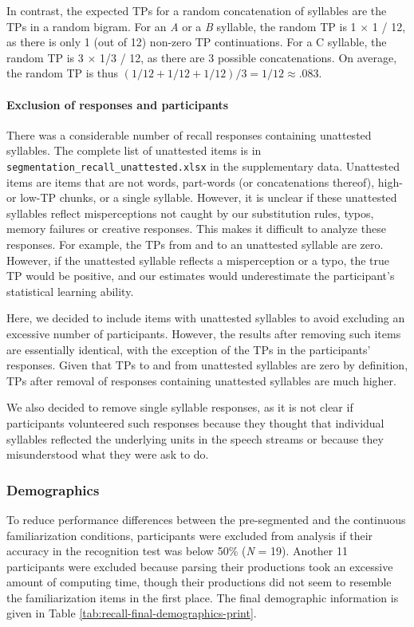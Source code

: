 \documentclass[]{article}
\let\oldparagraph\paragraph
\renewcommand{\paragraph}[1]{\oldparagraph{#1}\mbox{}}
\begin{document}
In contrast, the expected TPs for a random concatenation of syllables are the TPs in a random bigram. For an \emph{A} or a \emph{B} syllable, the random TP is 1 \(\times\) 1 / 12, as there is only 1 (out of 12) non-zero TP continuations. For a C syllable, the random TP is 3 \(\times\) 1/3 / 12, as there are 3 possible concatenations. On average, the random TP is thus \((1/12 + 1/12 + 1/12)/ 3 = 1/12 \approx .083\).

\paragraph{Exclusion of responses and participants}\label{exclusion-of-responses-and-participants}

There was a considerable number of recall responses containing unattested syllables. The complete list of unattested items is in \texttt{segmentation\_recall\_unattested.xlsx} in the supplementary data. Unattested items are items that are not words, part-words (or concatenations thereof), high- or low-TP chunks, or a single syllable. However, it is unclear if these unattested syllables reflect misperceptions not caught by our substitution rules, typos, memory failures or creative responses. This makes it difficult to analyze these responses. For example, the TPs from and to an unattested syllable are zero. However, if the unattested syllable reflects a misperception or a typo, the true TP would be positive, and our estimates would underestimate the participant's statistical learning ability.

Here, we decided to include items with unattested syllables to avoid excluding an excessive number of participants. However, the results after removing such items are essentially identical, with the exception of the TPs in the participants' responses. Given that TPs to and from unattested syllables are zero by definition, TPs after removal of responses containing unattested syllables are much higher.

We also decided to remove single syllable responses, as it is not clear if participants volunteered such responses because they thought that individual syllables reflected the underlying units in the speech streams or because they misunderstood what they were ask to do.

\subsubsection{Demographics}

To reduce performance differences between the pre-segmented and the continuous familiarization conditions, participants were excluded from analysis if their accuracy in the recognition test was below 50\% (\emph{N} = 19). Another 11 participants were excluded because parsing their productions took an excessive amount of computing time, though their productions did not seem to resemble the familiarization items in the first place. The final demographic information is given in Table \ref{tab:recall-final-demographics-print}.
\end{document}
